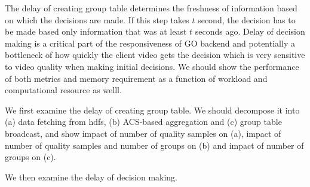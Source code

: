 The delay of creating group table determines the freshness of information based on which the decisions are made. If this step takes $t$ second, the decision has to be made based only information that was at least $t$ seconds ago. Delay of decision making is a critical part of the responsiveness of GO backend and potentially a bottleneck of how quickly the client video gets the decision which is very sensitive to video quality when making initial decisions. 
We should show the performance of both metrics and memory requirement as a function of workload and computational resource as welll. \fillme


 We first examine the delay of creating group table. We should decompose it into (a) data fetching from hdfs, (b) ACS-based aggregation and (c) group table broadcast, and show impact of number of quality samples on (a), impact of number of quality samples and number of groups on (b) and impact of number of groups on (c).

 We then examine the delay of decision making. \fillme







